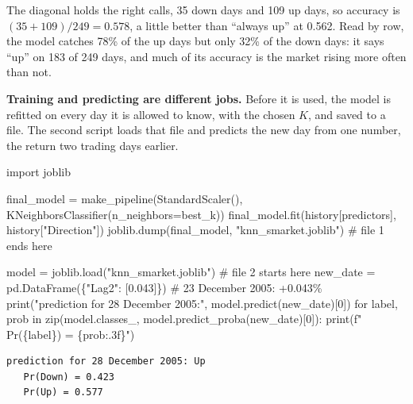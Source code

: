 \documentclass[
  letterpaper,
  10pt,
  twoside,
  openright,
  numbers=noenddot,
  chapterprefix=true]{scrbook}
\newenvironment{Shaded}{}{}
\newcommand{\BuiltInTok}[1]{\textcolor[rgb]{0.84,0.23,0.29}{#1}}
\newcommand{\CommentTok}[1]{\textcolor[rgb]{0.42,0.45,0.49}{#1}}
\newcommand{\ControlFlowTok}[1]{\textcolor[rgb]{0.84,0.23,0.29}{#1}}
\newcommand{\DecValTok}[1]{\textcolor[rgb]{0.00,0.36,0.77}{#1}}
\newcommand{\FloatTok}[1]{\textcolor[rgb]{0.00,0.36,0.77}{#1}}
\newcommand{\ImportTok}[1]{\textcolor[rgb]{0.01,0.18,0.38}{#1}}
\newcommand{\KeywordTok}[1]{\textcolor[rgb]{0.84,0.23,0.29}{#1}}
\newcommand{\NormalTok}[1]{\textcolor[rgb]{0.14,0.16,0.18}{#1}}
\newcommand{\OperatorTok}[1]{\textcolor[rgb]{0.14,0.16,0.18}{#1}}
\newcommand{\SpecialCharTok}[1]{\textcolor[rgb]{0.00,0.36,0.77}{#1}}
\newcommand{\SpecialStringTok}[1]{\textcolor[rgb]{0.01,0.18,0.38}{#1}}
\newcommand{\StringTok}[1]{\textcolor[rgb]{0.01,0.18,0.38}{#1}}
\begin{document}
The diagonal holds the right calls, 35 down days and 109 up days, so
accuracy is \((35 + 109)/249 = 0.578\), a little better than ``always
up'' at 0.562. Read by row, the model catches 78\% of the up days but
only 32\% of the down days: it says ``up'' on 183 of 249 days, and much
of its accuracy is the market rising more often than not.

\textbf{Training and predicting are different jobs.} Before it is used,
the model is refitted on every day it is allowed to know, with the
chosen \(K\), and saved to a file. The second script loads that file and
predicts the new day from one number, the return two trading days
earlier.

\label{check-smarket-predict}
\begin{Shaded}
\begin{Highlighting}[]
\ImportTok{import}\NormalTok{ joblib}

\NormalTok{final\_model }\OperatorTok{=}\NormalTok{ make\_pipeline(StandardScaler(), KNeighborsClassifier(n\_neighbors}\OperatorTok{=}\NormalTok{best\_k))}
\NormalTok{final\_model.fit(history[predictors], history[}\StringTok{"Direction"}\NormalTok{])}
\NormalTok{joblib.dump(final\_model, }\StringTok{"knn\_smarket.joblib"}\NormalTok{)           }\CommentTok{\# file 1 ends here}

\NormalTok{model }\OperatorTok{=}\NormalTok{ joblib.load(}\StringTok{"knn\_smarket.joblib"}\NormalTok{)                }\CommentTok{\# file 2 starts here}
\NormalTok{new\_date }\OperatorTok{=}\NormalTok{ pd.DataFrame(\{}\StringTok{"Lag2"}\NormalTok{: [}\FloatTok{0.043}\NormalTok{]\})               }\CommentTok{\# 23 December 2005: +0.043\%}
\BuiltInTok{print}\NormalTok{(}\StringTok{"prediction for 28 December 2005:"}\NormalTok{, model.predict(new\_date)[}\DecValTok{0}\NormalTok{])}
\ControlFlowTok{for}\NormalTok{ label, prob }\KeywordTok{in} \BuiltInTok{zip}\NormalTok{(model.classes\_, model.predict\_proba(new\_date)[}\DecValTok{0}\NormalTok{]):}
    \BuiltInTok{print}\NormalTok{(}\SpecialStringTok{f"   Pr(}\SpecialCharTok{\{}\NormalTok{label}\SpecialCharTok{\}}\SpecialStringTok{) = }\SpecialCharTok{\{}\NormalTok{prob}\SpecialCharTok{:.3f\}}\SpecialStringTok{"}\NormalTok{)}
\end{Highlighting}
\end{Shaded}

\begin{verbatim}
prediction for 28 December 2005: Up
   Pr(Down) = 0.423
   Pr(Up) = 0.577
\end{verbatim}
\end{document}
